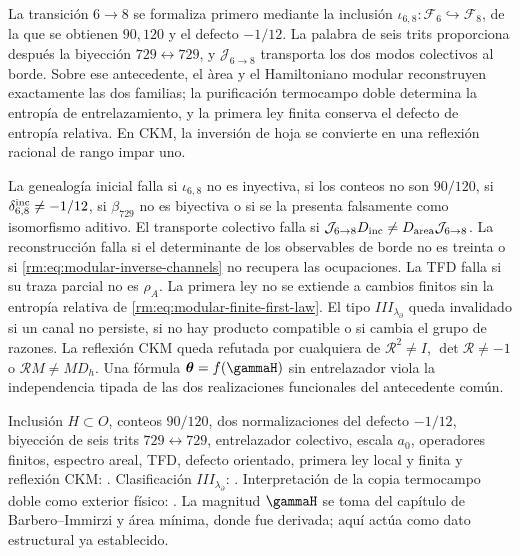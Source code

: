 \begin{keyresult}
La transici\'on \(6\to8\) se formaliza primero mediante la inclusi\'on
\(\iota_{6,8}:\mathcal F_6\hookrightarrow\mathcal F_8\), de la que se
obtienen
\(90,120\) y el defecto \(-1/12\). La palabra de seis trits proporciona
despu\'es la biyecci\'on \(729\leftrightarrow729\), y
\(\mathcal J_{6\to8}\) transporta los dos modos colectivos al borde. Sobre
ese antecedente, el \`area y el Hamiltoniano modular reconstruyen exactamente
las dos familias; la purificaci\'on termocampo doble determina la entrop\'ia
de entrelazamiento, y la primera ley
finita conserva el defecto de entrop\'ia relativa. En CKM, la inversi\'on de
hoja se convierte en una reflexi\'on racional de rango impar uno.
\end{keyresult}

\begin{falsifier}
La genealog\'ia inicial falla si \(\iota_{6,8}\) no es inyectiva, si los
conteos no son \(90/120\), si \(\delta_{6,8}^{\rm inc}\neq-1/12\), si
\(\beta_{729}\) no es biyectiva o si se la presenta falsamente como
isomorfismo aditivo. El transporte colectivo falla si
\(\mathcal J_{6\to8}D_{\rm inc}\neq
D_{\rm area}\mathcal J_{6\to8}\). La reconstrucci\'on falla si el
determinante de los observables de borde no es treinta o si
\cref{rm:eq:modular-inverse-channels} no recupera las ocupaciones.
La TFD falla si su traza parcial no es \(\rho_A\). La primera ley no se
extiende a cambios finitos sin la entrop\'ia relativa de
\cref{rm:eq:modular-finite-first-law}. El tipo
\(III_{\lambda_\partial}\) queda invalidado si un canal no persiste, si no hay
producto compatible o si cambia el grupo de razones. La reflexi\'on CKM
queda refutada por cualquiera de
\(\mathcal R^2\neq I\), \(\det\mathcal R\neq-1\) o
\(\mathcal RM\neq MD_h\). Una f\'ormula
\(\boldsymbol\theta=f(\gammaH)\) sin entrelazador viola la independencia
tipada de las dos realizaciones funcionales del antecedente com\'un.
\end{falsifier}

\begin{statusbox}
Inclusi\'on \(H\subset O\), conteos \(90/120\), dos normalizaciones del
defecto \(-1/12\), biyecci\'on de seis trits \(729\leftrightarrow729\),
entrelazador colectivo, escala \(a_0\), operadores finitos, espectro areal,
TFD, defecto orientado, primera ley local y finita y reflexi\'on CKM:
.
Clasificaci\'on
\(III_{\lambda_\partial}\): . Interpretaci\'on de la copia termocampo doble como exterior f\'isico:
. La magnitud \(\gammaH\) se toma
del capítulo de Barbero--Immirzi y área mínima, donde fue derivada; aquí actúa
como dato estructural ya establecido.
\end{statusbox}

